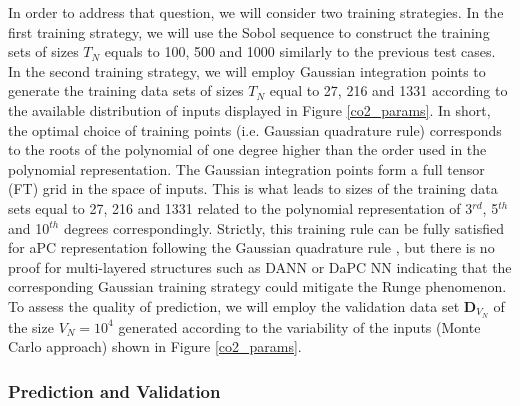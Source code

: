 \documentclass[a4paper,fleqn]{article}
\newcommand{\rw}[1]{\textcolor{blue}{#1}}
\renewcommand{\rw}[1]{#1}
\begin{document}
In order to address that question, we will consider two training strategies.  In the first training strategy, we will use the Sobol sequence \cite{sobol2011construction} to construct the training sets of sizes $T_N$ equals to 100, 500 and 1000 similarly to the previous test cases. In the second training strategy, we will employ Gaussian integration points \cite{villadsen1978solution,MR2061539} to generate the training data sets of sizes $T_N$ equal to 27, 216 and 1331 according to the available distribution \cite{OladNowak_RESS2012} of inputs displayed in Figure \ref{co2_params}. In short, the optimal choice \cite{villadsen1978solution} of training points \rw{(i.e. Gaussian quadrature rule)} corresponds to the roots of the polynomial of one degree higher than the order used in the polynomial representation. The Gaussian integration points form a full tensor (FT) grid in the space of inputs. This is what leads to sizes of the training data sets equal to 27, 216 and 1331 related to the polynomial representation of 3$^{rd}$, 5$^{th}$ and 10$^{th}$ degrees correspondingly. Strictly, this training rule can be fully satisfied for aPC representation \rw{following the Gaussian quadrature rule \cite{villadsen1978solution}}, but there is no proof for multi-layered structures such as DANN or DaPC NN indicating that the corresponding Gaussian training strategy could mitigate the Runge phenomenon. To assess the quality of prediction, we will employ the validation data set $\bm{D}_{V_N}$ of the size $V_N=10^4$ \cite{BenchmarkData} generated according to the variability of the inputs (Monte Carlo approach) shown in Figure \ref{co2_params}.

\subsubsection{Prediction and Validation}
\end{document}
